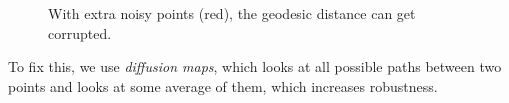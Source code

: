 \begin{figure}[H]
    \caption{With extra noisy points (red), the geodesic distance can get corrupted.} 
    \label{fig:isomap_problem}
  \end{figure}

  To fix this, we use \textit{diffusion maps}, which looks at all possible paths between two points and looks at some average of them, which increases robustness. 

